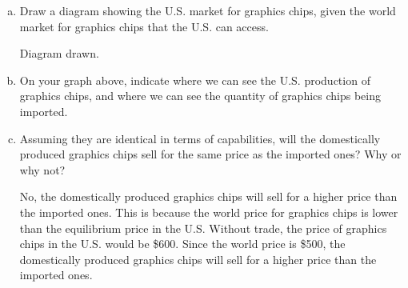 \documentclass{article}
\begin{document}
\begin{enumerate}[(a)]
    \item Draw a diagram showing the U.S. market for graphics chips, given the world market for graphics chips that the U.S. can access.
    
    Diagram drawn.

    \item On your graph above, indicate where we can see the U.S. production of graphics chips, and where we can see the quantity of graphics chips being imported.
    


    
    \item Assuming they are identical in terms of capabilities, will the domestically produced graphics chips sell for the same price as the imported ones? Why or why not?
    
    No, the domestically produced graphics chips will sell for a higher price than the imported ones. This is because the world price for graphics chips is lower than the equilibrium price in the U.S. Without trade, the price of graphics chips in the U.S. would be \$600. Since the world price is \$500, the domestically produced graphics chips will sell for a higher price than the imported ones.


\end{enumerate}
\end{document}
